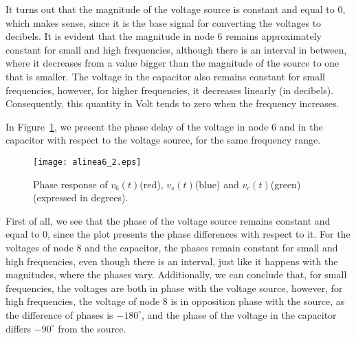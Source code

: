 It turns out that the magnitude of the voltage source is constant and equal to 0, which makes sense, since it is the base signal for converting the voltages to decibels. It is evident that the magnitude in node 6 remains approximately constant for small and high frequencies, although there is an interval in between, where it decreases from a value bigger than the magnitude of the source to one that is smaller. The voltage in the capacitor also remains constant for small frequencies, however, for higher frequencies, it decreases linearly (in decibels). Consequently, this quantity in Volt tends to zero when the frequency increases.

In Figure~\ref{fig:phase}, we present the phase delay of the voltage in node 6 and in the capacitor with respect to the voltage source, for the same frequency range.

\begin{figure}[H] \centering
\texttt{[image: alinea6\_2.eps]}
\caption{Phase response of $v_6(t)$(red), $v_s(t)$(blue) and $v_c(t)$(green) (expressed in degrees).}
\label{fig:phase}
\end{figure}

First of all, we see that the phase of the voltage source remains constant and equal to 0, since the plot presents the phase differences with respect to it. For the voltages of node 8 and the capacitor, the phases remain constant for small and high frequencies, even though there is an interval, just like it happens with the magnitudes, where the phases vary. Additionally, we can conclude that, for small frequencies, the voltages are both in phase with the voltage source, however, for high frequencies, the voltage of node 8 is in opposition phase with the source, as the difference of phases is $-180^{\circ}$, and the phase of the voltage in the capacitor differs $-90^{\circ}$ from the source.

